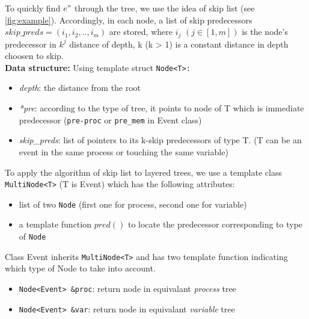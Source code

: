 \documentclass{llncs}
\begin{document}
	
To quickly find $e"$ through the tree, we use the idea of skip list
(see \ref{fig:example}).
Accordingly, in each node, a list of skip predecessors $
skip\_preds = (i_1, i_2,..,i_m)$ are stored, where $i_j$ $(j \in [1,m] )$ is the
node's predecessor in $k^{j}$ distance of depth, k (k > 1) is a constant
distance in depth choosen to skip.\\

\noindent
\textbf{Data structure:}
Using template struct \verb!Node<T>:!
\begin{itemize}
	\item \textit{depth}: the distance from the root
	\item \textit{*pre}: according to the type of tree, it points to node of T which is immediate predecessor (\verb!pre-proc! or \verb!pre_mem! in Event class)
	\item \textit{skip\_preds}: list of pointers to its k-skip predecessors of type T.	
(T can be an event in the same process or touching the same variable)
\end{itemize}

To apply the algorithm of skip list to layered trees, we use a template class \verb!MultiNode<T>! (T is Event) which has the following attributes:
\begin{itemize}
	\item list of two \verb!Node! (first one for process, second one for variable)
	\item a template function $pred()$ to locate the predecessor corresponding to type of \verb!Node!
\end{itemize}
 
 Class Event inherits \verb!MultiNode<T>! and has two template function indicating which type of Node to take into account.
\begin{itemize}
\item	
	\verb!Node<Event> &proc!: return node in equivalant \textit{process} tree
\item	
	\verb!Node<Event> &var!: return node in equivalant \textit{variable} tree 	
\end{itemize}
\end{document}
